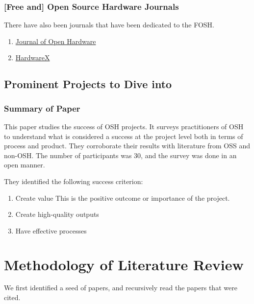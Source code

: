 \documentclass{article}
\begin{document}
\subsubsection{[Free and] Open Source Hardware Journals}
There have also been journals that have been dedicated to the FOSH.
\begin{enumerate}
    \item \href{https://openhardware.metajnl.com/}{Journal of Open Hardware}
    \item \href{https://www.sciencedirect.com/journal/hardwarex}{HardwareX}
\end{enumerate}

\subsection{Prominent Projects to Dive into}

\subsubsection{Summary of Paper}
This paper studies the success of OSH projects.
It surveys practitioners of OSH to understand what is considered a success at the project level both in terms of process and product. 
They corroborate their results with literature from OSS and non-OSH.
The number of participants was 30, and the survey was done in an open manner.

They identified the following success criterion:
\begin{enumerate}
    \item Create value
        This is the positive outcome or importance of the project. 
    \item Create high-quality outputs
    \item Have effective processes
\end{enumerate}

\section{Methodology of Literature Review}
We first identified a seed of papers, and recursively read the papers that were cited.
\end{document}
